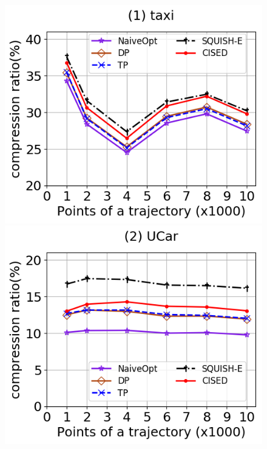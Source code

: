 \begin{figure}[tb!]
	\centering
	\includegraphics[scale=0.315]{Figures/Exp-SED-CR-size-taxi.png}\hspace{1ex}
	\includegraphics[scale=0.315]{Figures/Exp-SED-CR-size-service.png} 	\hspace{1ex}

\end{figure}
